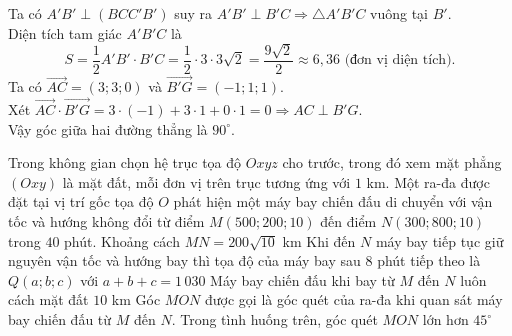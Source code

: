 \begin{ex}
{\begin{itemchoice}
\[			\]				
			\itemch Ta có $A'B'\perp (BCC'B')$ suy ra $A'B'\perp B'C\Rightarrow \triangle A'B'C$ vuông tại $B'$.\\
			Diện tích tam giác $A'B'C$ là \[S = \dfrac{1}{2} A'B' \cdot B'C= \dfrac{1}{2} \cdot 3 \cdot 3\sqrt{2} = \dfrac{9\sqrt{2}}{2} \approx 6{,}36 \text{ (đơn vị diện tích).}\]		
			\itemch Ta có $\overrightarrow{AC} = (3;3;0)$ và $\overrightarrow{B'G} = (-1;1;1)$.\\
			Xét $\overrightarrow{AC} \cdot \overrightarrow{B'G} = 3\cdot(-1) + 3\cdot1 + 0\cdot 1 = 0 \Rightarrow AC \perp B'G$.\\
			Vậy góc giữa hai đường thẳng là $90^\circ$.
		\end{itemchoice}				
	}
\end{ex}

\begin{ex}%
	Trong không gian chọn hệ trục tọa độ $Oxyz$ cho trước, trong đó xem mặt phẳng $(Oxy)$ là mặt đất, mỗi đơn vị trên trục tương ứng với $1$ km. Một ra-đa được đặt tại vị trí gốc tọa độ $O$ phát hiện một máy bay chiến đấu di chuyển với vận tốc và hướng không đổi từ điểm $M(500; 200; 10)$ đến điểm $N(300; 800; 10)$ trong $40$ phút.
	\choiceTF
	{\True Khoảng cách $MN = 200\sqrt{10}$ km}
	{Khi đến $N$ máy bay tiếp tục giữ nguyên vận tốc và hướng bay thì tọa độ của máy bay sau $8$ phút tiếp theo là $Q(a; b; c)$ với $a + b + c = 1\,030$}
	{\True Máy bay chiến đấu khi bay từ $M$ đến $N$ luôn cách mặt đất $10$ km}
	{\True Góc $MON$ được gọi là góc quét của ra-đa khi quan sát máy bay chiến đấu từ $M$ đến $N$. Trong tình huống trên, góc quét $MON$ lớn hơn $45^{\circ}$}
\end{ex}
